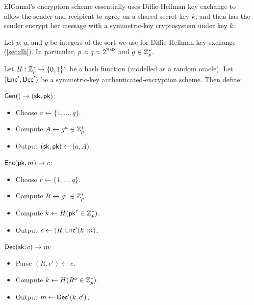ElGamal's encryption scheme essentially uses Diffie-Hellman key exchange to allow
the sender and recipient to agree on a shared secret key $k$, and then has
the sender encrypt her message with a symmetric-key cryptosystem under key $k$.

\begin{definition}
Let $p$, $q$, and $g$ be integers of the sort we use for Diffie-Hellman
key exchange (\cref{sec:dh}).
In particular, $p \approx q \approx 2^{2048}$
and $g \in \mathbb{Z}^*_p$.

Let $H: \mathbb{Z}^*_p \rightarrow \{0,1\}^*$ be a hash function (modelled as a random oracle). Let $(\mathsf{Enc}', \mathsf{Dec}')$ 
be a symmetric-key authenticated-encryption scheme. Then define:

\begin{compactitem}
\item $\mathsf{Gen}() \to ({\mathsf{sk}}, \mathsf{pk})$:
    \begin{itemize}[noitemsep]
          \item Choose $a \gets \{1, \dots, q\}$.
          \item Compute $A \gets g^a \in \mathbb{Z}^*_p$.
          \item Output $({\mathsf{sk}}, \mathsf{pk}) \gets (a, A)$.	
    \end{itemize}
  \item $\mathsf{Enc}(\mathsf{pk}, m) \to c$:
    \begin{itemize}[noitemsep]
      \item Choose $r \gets \{1, \dots, q\}$.
      \item Compute $R \gets g^r \in \mathbb{Z}^*_p$.
      \item Compute $k \gets H(\mathsf{pk}^r \in \mathbb{Z}^*_p)$.
      \item Output $c \gets (R, \mathsf{Enc}'(k, m)$.
    \end{itemize}

  \item $\mathsf{Dec}({\mathsf{sk}}, c) \to m$:
    \begin{itemize}[noitemsep]
      \item Parse $(R, c') \gets c$.
      \item Compute $k \gets H(R^a \in \mathbb{Z}^*_p)$.
      \item Output $m \gets \mathsf{Dec}'(k, c')$.
    \end{itemize}
\end{compactitem}
\end{definition}


